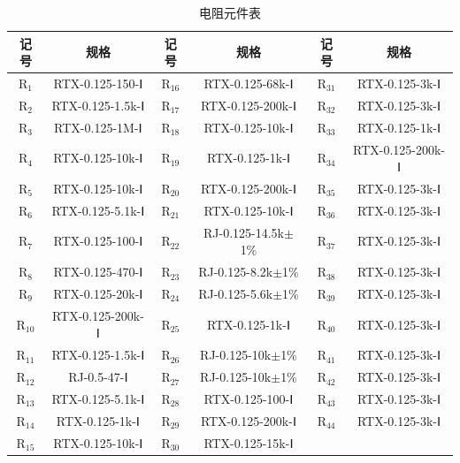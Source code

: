 \documentclass[12pt,UTF8]{ctexbook}
\begin{document}
	\begin{table}[H]
		\centering
		\small
		\setlength{\tabcolsep}{4pt}
		\caption{电阻元件表}
		\begin{tabular}{|c|c||c|c||c|c|}
			\hline
			\textbf{记号} & \textbf{规格} & \textbf{记号} & \textbf{规格} & \textbf{记号} & \textbf{规格} \\ \hline
			R\(_1\) & RTX-0.125-150-Ⅰ & R\(_{16}\) & RTX-0.125-68k-Ⅰ & R\(_{31}\) & RTX-0.125-3k-Ⅰ \\ \hline
			R\(_2\) & RTX-0.125-1.5k-Ⅰ & R\(_{17}\) & RTX-0.125-200k-Ⅰ & R\(_{32}\) & RTX-0.125-3k-Ⅰ \\ \hline
			R\(_3\) & RTX-0.125-1M-Ⅰ & R\(_{18}\) & RTX-0.125-10k-Ⅰ & R\(_{33}\) & RTX-0.125-1k-Ⅰ \\ \hline
			R\(_4\) & RTX-0.125-10k-Ⅰ & R\(_{19}\) & RTX-0.125-1k-Ⅰ & R\(_{34}\) & RTX-0.125-200k-Ⅰ \\ \hline
			R\(_5\) & RTX-0.125-10k-Ⅰ & R\(_{20}\) & RTX-0.125-200k-Ⅰ & R\(_{35}\) & RTX-0.125-3k-Ⅰ \\ \hline
			R\(_6\) & RTX-0.125-5.1k-Ⅰ & R\(_{21}\) & RTX-0.125-10k-Ⅰ & R\(_{36}\) & RTX-0.125-3k-Ⅰ \\ \hline
			R\(_7\) & RTX-0.125-100-Ⅰ & R\(_{22}\) & RJ-0.125-14.5k\(\pm\)1\% & R\(_{37}\) & RTX-0.125-3k-Ⅰ \\ \hline
			R\(_8\) & RTX-0.125-470-Ⅰ & R\(_{23}\) & RJ-0.125-8.2k\(\pm\)1\% & R\(_{38}\) & RTX-0.125-3k-Ⅰ \\ \hline
			R\(_9\) & RTX-0.125-20k-Ⅰ & R\(_{24}\) & RJ-0.125-5.6k\(\pm\)1\% & R\(_{39}\) & RTX-0.125-3k-Ⅰ \\ \hline
			R\(_{10}\) & RTX-0.125-200k-Ⅰ & R\(_{25}\) & RTX-0.125-1k-Ⅰ & R\(_{40}\) & RTX-0.125-3k-Ⅰ \\ \hline
			R\(_{11}\) & RTX-0.125-1.5k-Ⅰ & R\(_{26}\) & RJ-0.125-10k\(\pm\)1\% & R\(_{41}\) & RTX-0.125-3k-Ⅰ \\ \hline
			R\(_{12}\) & RJ-0.5-47-Ⅰ & R\(_{27}\) & RJ-0.125-10k\(\pm\)1\% & R\(_{42}\) & RTX-0.125-3k-Ⅰ \\ \hline
			R\(_{13}\) & RTX-0.125-5.1k-Ⅰ & R\(_{28}\) & RTX-0.125-100-Ⅰ & R\(_{43}\) & RTX-0.125-3k-Ⅰ \\ \hline
			R\(_{14}\) & RTX-0.125-1k-Ⅰ & R\(_{29}\) & RTX-0.125-200k-Ⅰ & R\(_{44}\) & RTX-0.125-3k-Ⅰ \\ \hline
			R\(_{15}\) & RTX-0.125-10k-Ⅰ & R\(_{30}\) & RTX-0.125-15k-Ⅰ & & \\ \hline
		\end{tabular}
	\end{table}
	
\end{document}

